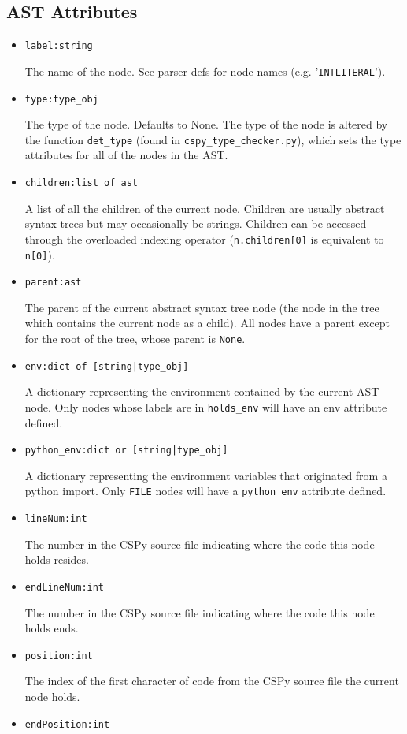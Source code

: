 \documentclass{article}
\begin{document}
\subsection{AST Attributes}
\begin{itemize}
\item \verb|label:string| 

The name of the node. See parser defs for node names (e.g. '\verb|INTLITERAL|').
\item \verb|type:type_obj| 

The type of the node. Defaults to None. The type of the node is altered by the function \verb|det_type| (found in \verb|cspy_type_checker.py|), which sets the type attributes for all of the nodes in the AST.
\item \verb|children:list of ast| 

A list of all the children of the current node. Children are usually abstract syntax trees but may occasionally be strings. Children can be accessed through the overloaded indexing operator (\verb|n.children[0]| is equivalent to \verb|n[0]|).
\item \verb|parent:ast| 

The parent of the current abstract syntax tree node (the node in the tree which contains the current node as a child). All nodes have a parent except for the root of the tree, whose parent is \verb|None|.
\item \verb!env:dict of [string|type_obj]! 

A dictionary representing the environment contained by the current AST node. Only nodes whose labels are in \verb|holds_env| will have an env attribute defined.
\item \verb!python_env:dict or [string|type_obj]!

A dictionary representing the environment variables that originated from a python import. Only \verb|FILE| nodes will have a \verb|python_env| attribute defined.
\item \verb|lineNum:int| 

The number in the CSPy source file indicating where the code this node holds resides.
\item \verb|endLineNum:int| 

The number in the CSPy source file indicating where the code this node holds ends.
\item \verb|position:int| 

The index of the first character of code from the CSPy source file the current node holds.
\item \verb|endPosition:int| 


\end{itemize}
\end{document}
